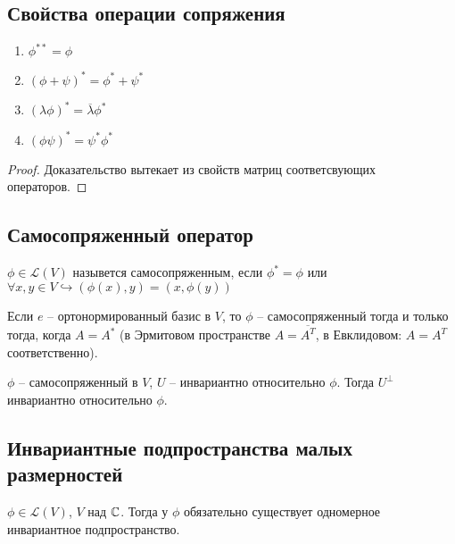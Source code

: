 \subsection{Свойства операции сопряжения}
\begin{proposition}
    \begin{enumerate}
        \item $\phi^{**} = \phi$
        \item $(\phi + \psi)^* = \phi^* + \psi^*$
        \item $(\lambda \phi)^* = \overline{\lambda}\phi^*$
        \item $(\phi \psi)^* = \psi^* \phi^*$
    \end{enumerate}
\end{proposition}

\begin{proof}
    Доказательство вытекает из свойств матриц соответсвующих операторов.
\end{proof}

\subsection{Самосопряженный оператор}
\begin{definition}
    $\phi \in \mathcal{L}(V)$ назывется самосопряженным, если $\phi^* = \phi$ или $\forall x, y \in V \hookrightarrow (\phi(x), y) = (x, \phi(y))$
\end{definition}

\begin{corollary}
    Если $e$ -- ортонормированный базис в $V$, то $\phi$ -- самосопряженный тогда и только тогда, когда $A = A^*$ (в Эрмитовом пространстве $A = \overline{A^T}$, в Евклидовом: $A = A^T$ соответственно).
\end{corollary}

\begin{corollary}
    $\phi$ -- самосопряженный в $V$, $U$ -- инвариантно относительно $\phi$. Тогда $U^{\perp}$ инвариантно относительно $\phi$.
\end{corollary}

\subsection{Инвариантные подпространства малых размерностей}
\begin{proposition}
    $\phi \in \mathcal{L}(V)$, $V$ над $\mathbb{C}$.
    Тогда у $\phi$ обязательно существует одномерное инвариантное подпространство.
\end{proposition}

